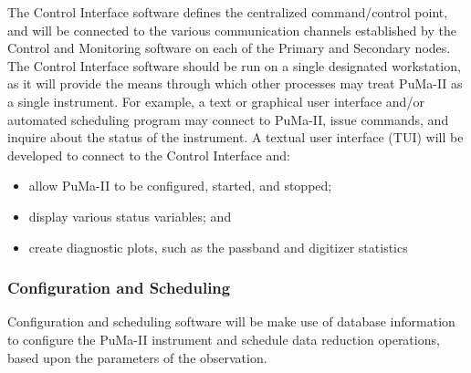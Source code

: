 The Control Interface software defines the centralized command/control
point, and will be connected to the various communication channels
established by the Control and Monitoring software on each of the
Primary and Secondary nodes.  The Control Interface software should be
run on a single designated workstation, as it will provide the means
through which other processes may treat PuMa-II as a single
instrument.  For example, a text or graphical user interface and/or
automated scheduling program may connect to PuMa-II, issue commands,
and inquire about the status of the instrument.  A textual user
interface (TUI) will be developed to connect to the Control Interface
and:
\begin{itemize}
\item allow PuMa-II to be configured, started, and stopped;

\item display various status variables; and

\item create diagnostic plots, such as the passband and digitizer statistics
\end{itemize}

\subsubsection{Configuration and Scheduling}

Configuration and scheduling software will be make use of database
information to configure the PuMa-II instrument and schedule data
reduction operations, based upon the parameters of the observation.
